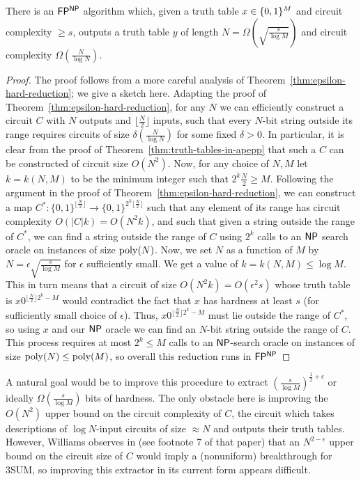\begin{theorem}\label{thm:hardness-extractor}
There is an $\cl{FP^{NP}}$ algorithm which, given a truth table $x\in \{0,1\}^M$ and circuit complexity $\geq s$, outputs a truth table $y$ of length $N = {\Omega}(\sqrt{\frac{s}{\log M}})$ and circuit complexity $\Omega(\frac{N}{\log N})$.
\end{theorem}
\begin{proof}
The proof follows from a more careful analysis of Theorem~\ref{thm:epsilon-hard-reduction}; we give a sketch here. Adapting the proof of Theorem~\ref{thm:epsilon-hard-reduction}, for any $N$ we can efficiently construct a circuit $C$ with $N$ outputs and $\lfloor\frac{N}{2}\rfloor$ inputs, such that every $N$-bit string outside its range requires circuits of size $\delta(\frac{N}{\log N})$ for some fixed $\delta > 0$. 
In particular, it is clear from the proof of Theorem~\ref{thm:truth-tables-in-apepp} that such a $C$ can be constructed of circuit size $O(N^2)$.
Now, for any choice of $N,M$ let $k = k(N,M)$ to be the minimum integer such that $2^k\frac{N}{2} \geq M$. Following the argument in the proof of Theorem~\ref{thm:epsilon-hard-reduction}, we can construct a map $C^*: \{0,1\}^{\lfloor\frac{N}{2}\rfloor} \rightarrow \{0,1\}^{2^k\lfloor\frac{N}{2}\rfloor}$ such that any element of its range has circuit complexity $O(|C|k) = O(N^2k)$, and such that given a string outside the range of $C^*$, we can find a string outside the range of $C$ using $2^k$ calls to an $\cl{NP}$ search oracle on instances of size $\mathrm{poly}(N)$. Now, we set $N$ as a function of $M$ by $N = \epsilon\sqrt{\frac{s}{\log M}}$ for $\epsilon$ sufficiently small. We get a value of $k = k(N,M) \leq \log M$. This in turn means that a circuit of size $O(N^2 k) = O(\epsilon^2 s)$ whose truth table is $x0^{\lfloor\frac{N}{2}\rfloor2^k-M}$ would contradict the fact that $x$ has hardness at least $s$ (for sufficiently small choice of $\epsilon$). Thus, $x0^{\lfloor\frac{N}{2}\rfloor2^k-M}$ must lie outside the range of $C^*$, so using $x$ and our $\cl{NP}$ oracle we can find an $N$-bit string outside the range of $C$. This process requires at most $2^k \leq M$ calls to an $\cl{NP}$-search oracle on instances of size $\mathrm{poly}(N) \leq \mathrm{poly}(M)$, so overall this reduction runs in $\cl{FP^{NP}}$
\end{proof}

A natural goal would be to improve this procedure to extract $(\frac{s}{\log M})^{\frac{1}{2} + \epsilon}$ or ideally $\Omega(\frac{s}{\log M})$ bits of hardness. The only obstacle here is improving the $O(N^2)$ upper bound on the circuit complexity of $C$, the circuit which takes descriptions of $\log N$-input circuits of size $\approx N$ and outputs their truth tables. However, Williams observes in \cite{sat-lb} (see footnote 7 of that paper) that an $N^{2 - \epsilon}$ upper bound on the circuit size of $C$ would imply a (nonuniform) breakthrough for {\sc 3SUM}, so improving this extractor in its current form appears difficult.

